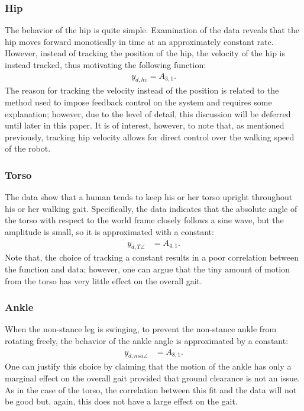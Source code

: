 \subsubsection{Hip} The behavior of the hip is quite simple. Examination of the data reveals that the hip moves forward monotically in time at an approximately constant rate. However, instead of tracking the position of the hip, the velocity of the hip is instead tracked, thus motivating the following function:
\begin{align*}
  y_{d,hv} = A_{3,1}.
\end{align*}
The reason for tracking the velocity instead of the position is related to the method used to impose feedback control on the system and requires some explanation; however, due to the level of detail, this discussion will be deferred until later in this paper. It is of interest, however, to note that, as mentioned previously, tracking hip velocity allows for direct control over the walking speed of the robot.

\subsubsection{Torso} The data show that a human tends to keep his or her torso upright throughout his or her walking gait. Specifically, the data indicates that the absolute angle of the torso with respect to the world frame closely follows a sine wave, but the amplitude is small, so it is approximated with a constant:
\begin{align*}
  y_{d,T\angle} &= A_{4,1}.
\end{align*}
Note that, the choice of tracking a constant results in a poor correlation between the function and data; however, one can argue that the tiny amount of motion from the torso has very little effect on the overall gait.

\subsubsection{Ankle} When the non-stance leg is swinging, to prevent the non-stance ankle from rotating freely, the behavior of the ankle angle is approximated by a constant:
\begin{align*}
  y_{d,nsa\angle} &= A_{8,1}.
\end{align*}
One can justify this choice by claiming that the motion of the ankle has only a marginal effect on the overall gait provided that ground clearance is not an issue. As in the case of the torso, the correlation between this fit and the data will not be good but, again, this does not have a large effect on the gait.


